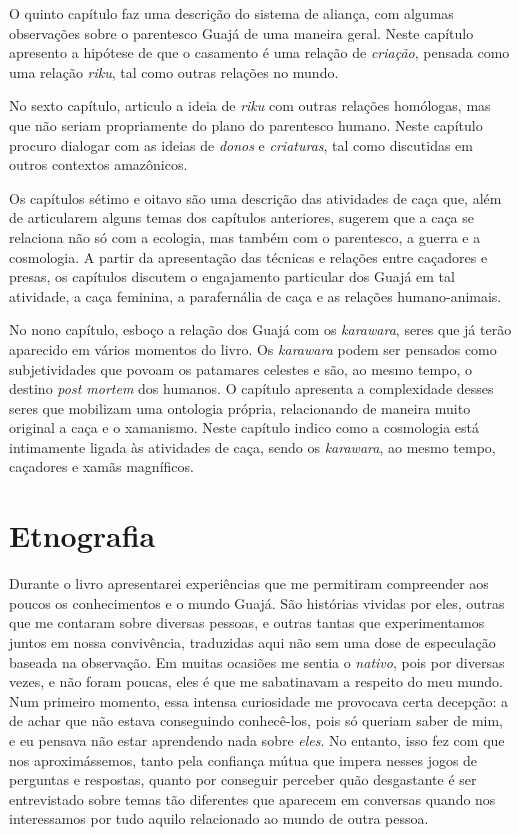O quinto capítulo faz uma descrição do sistema de aliança, com
algumas observações sobre o parentesco Guajá de uma maneira geral. Neste
capítulo apresento a hipótese de que o casamento é uma relação de
\textit{criação}, pensada como uma relação \textit{riku}, tal como outras
relações no mundo.

No sexto capítulo, articulo a ideia de \textit{riku} com outras relações homólogas, mas que não seriam
propriamente do plano do parentesco humano. Neste capítulo procuro
dialogar com as ideias de \textit{donos} e \textit{criaturas}, tal como discutidas em
outros contextos amazônicos.

Os capítulos sétimo e oitavo são uma descrição das atividades de caça
que, além de articularem alguns temas dos capítulos anteriores, sugerem
que a caça se relaciona não só com a ecologia, mas também com o
parentesco, a guerra e a cosmologia. A partir da apresentação das
técnicas e relações entre caçadores e presas, os capítulos discutem o
engajamento particular dos Guajá em tal atividade, a caça feminina, a
parafernália de caça e as relações humano-animais.

No nono capítulo, esboço a relação dos Guajá com os
\textit{karawara}, seres que já terão aparecido em vários momentos do
livro. Os \textit{karawara} podem ser pensados como subjetividades que
povoam os patamares celestes e são, ao mesmo tempo, o destino \textit{post
mortem} dos humanos. O capítulo apresenta a complexidade desses seres
que mobilizam uma ontologia própria, relacionando de maneira muito
original a caça e o xamanismo. Neste capítulo indico como a
cosmologia está intimamente ligada às atividades de caça, sendo os
\textit{karawara}, ao mesmo tempo, caçadores e xamãs magníficos.

\section{Etnografia}

Durante o livro apresentarei experiências que me permitiram compreender
aos poucos os conhecimentos e o mundo Guajá. São histórias vividas por
eles, outras que me contaram sobre diversas pessoas, e outras tantas que
experimentamos juntos em nossa convivência, traduzidas aqui não sem uma
dose de especulação baseada na observação. Em muitas ocasiões me sentia
o \textit{nativo}, pois por diversas vezes, e não foram poucas, eles é que me
sabatinavam a respeito do meu mundo. Num primeiro momento, essa intensa
curiosidade me provocava certa decepção: a de achar que não estava
conseguindo conhecê-los, pois só queriam saber de mim, e eu pensava não
estar aprendendo nada sobre \textit{eles}. No entanto, isso fez com que
nos aproximássemos, tanto pela confiança mútua que impera nesses jogos
de perguntas e respostas, quanto por conseguir perceber quão desgastante
é ser entrevistado sobre temas tão diferentes que aparecem em conversas
quando nos interessamos por tudo aquilo relacionado ao mundo de outra
pessoa.

